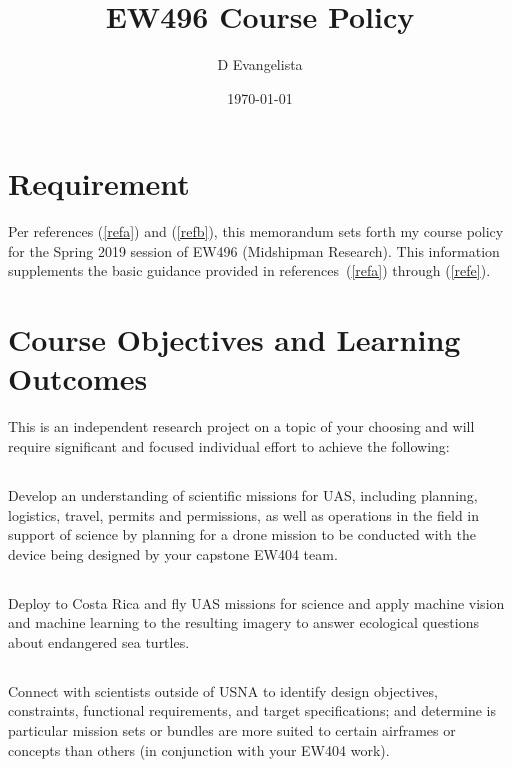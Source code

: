 \documentclass[10pt,courier]{navymemo}
\author{D Evangelista}
\title{EW496 Course Policy}
\date{\today}
\begin{document}
\makedateblock{}

\MEMORANDUM{}

\begin{navyletterheader}
\navyskip{}%

\navysubjline{}
\navyskip{}%
\end{navyletterheader}

\section{Requirement}
Per references (\ref{refa}) and (\ref{refb}), this memorandum sets forth my course policy for the Spring 2019 session of EW496 (Midshipman Research).  This information supplements the basic guidance provided in references~(\ref{refa}) through (\ref{refe}). 

\section{Course Objectives and Learning Outcomes}  This is an independent research project on a topic of your choosing and will require significant and focused individual effort to achieve the following:
\subsection{} Develop an understanding of scientific missions for UAS, including planning, logistics, travel, permits and permissions, as well as operations in the field in support of science by planning for a drone mission to be conducted with the device being designed by your capstone EW404 team.
\subsection{} Deploy to Costa Rica and fly UAS missions for science and apply machine vision and machine learning to the resulting imagery to answer ecological questions about endangered sea turtles.   
\subsection{} Connect with scientists outside of USNA to identify design objectives, constraints, functional requirements, and target specifications; and determine is particular mission sets or bundles are more suited to certain airframes or concepts than others (in conjunction with your EW404 work). 
\end{document}
